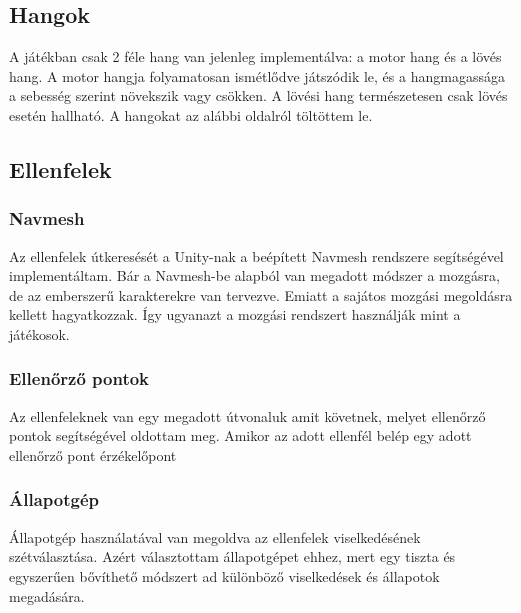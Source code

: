 \documentclass[
]{thesis-ekf}
\theoremstyle{definition}
\theoremstyle{remark}
\begin{document}
\subsection{Hangok}

A játékban csak 2 féle hang van jelenleg implementálva: a motor hang és a lövés hang.
A motor hangja folyamatosan ismétlődve játszódik le, és a hangmagassága a sebesség szerint növekszik vagy csökken. A lövési hang természetesen csak lövés esetén hallható. A hangokat az alábbi oldalról\cite{freesound} töltöttem le.

\subsection{Ellenfelek}

\subsubsection{Navmesh}

Az ellenfelek útkeresését a Unity-nak a beépített Navmesh rendszere segítségével implementáltam. Bár a Navmesh-be alapból van megadott módszer a mozgásra, de az emberszerű karakterekre van tervezve. Emiatt a sajátos mozgási megoldásra kellett hagyatkozzak. Így ugyanazt a mozgási rendszert használják mint a játékosok.

\subsubsection{Ellenőrző pontok}

Az ellenfeleknek van egy megadott útvonaluk amit követnek, melyet ellenőrző pontok segítségével oldottam meg. Amikor
az adott ellenfél belép egy adott ellenőrző pont érzékelőpont




\subsubsection{Állapotgép}

Állapotgép használatával van megoldva az ellenfelek viselkedésének szétválasztása. Azért választottam állapotgépet ehhez, mert egy tiszta és egyszerűen bővíthető módszert ad különböző viselkedések és állapotok megadására.


\end{document}
